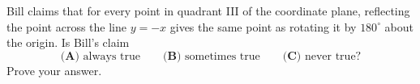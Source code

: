 Bill claims that for every point in quadrant III of the coordinate plane, reflecting the point across the line $y=-x$ gives the same point as rotating it by $180^\circ$ about the origin. Is Bill's claim
\[\textbf{(A) }\text{always true}\qquad\textbf{(B) }\text{sometimes true}\qquad\textbf{(C) }\text{never true}?\]
Prove your answer.
